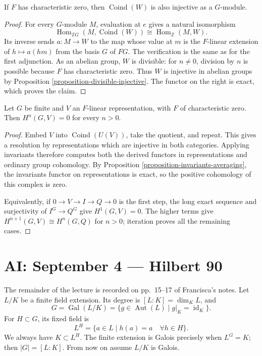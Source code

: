 \begin{proposition}
\label{proposition-coind-injective-4-sept}
If $F$ has characteristic zero, then
$\operatorname{Coind}(W)$ is also
injective as a $G$-module.
\end{proposition}

\begin{proof}
For every $G$-module $M$, evaluation at
$e$ gives a natural isomorphism
$$
\operatorname{Hom}_{\mathbb{Z}G}
(M,\operatorname{Coind}(W))
\cong\operatorname{Hom}_{\mathbb{Z}}(M,W).
$$
Its inverse sends $a:M\to W$ to the map
whose value at $m$ is the $F$-linear
extension of $h\mapsto a(hm)$ from the
basis $G$ of $FG$. The verification is
the same as for the first adjunction.
As an abelian group, $W$ is divisible:
for $n\ne0$, division by $n$ is possible
because $F$ has characteristic zero.
Thus $W$ is injective in abelian groups
by Proposition
\ref{proposition-divisible-injective}.
The functor on the right is exact,
which proves the claim.
\end{proof}

\begin{theorem}
\label{theorem-group-vanishing-4-sept}
Let $G$ be finite and $V$ an $F$-linear
representation, with $F$ of characteristic
zero. Then $H^n(G,V)=0$ for every $n>0$.
\end{theorem}

\begin{proof}
Embed $V$ into $\operatorname{Coind}(U(V))$,
take the quotient, and repeat. This gives
a resolution by representations which are
injective in both categories. Applying
invariants therefore computes both the
derived functors in representations and
ordinary group cohomology.
By Proposition
\ref{proposition-invariants-averaging},
the invariants functor on representations
is exact, so the positive cohomology
of this complex is zero.

Equivalently, if $0\to V\to I\to Q\to0$
is the first step, the long exact sequence
and surjectivity of $I^G\to Q^G$ give
$H^1(G,V)=0$. The higher terms give
$H^{n+1}(G,V)\cong H^n(G,Q)$ for $n>0$;
iteration proves all the remaining cases.
\end{proof}

\section{AI: September 4 --- Hilbert 90}
\label{section-hilberts-theorem-90-4-sept}

\noindent
The remainder of the lecture is recorded
on pp.~15--17 of Francisca's notes.
Let $L/K$ be a finite field extension.
Its degree is $[L:K]=\dim_K L$, and
$$
G=\operatorname{Gal}(L/K)
=\{g\in\operatorname{Aut}(L)\mid
g|_K=\operatorname{id}_K\}.
$$
For $H\subset G$, its fixed field is
$$
L^H=\{a\in L\mid h(a)=a
\quad\forall h\in H\}.
$$
We always have $K\subset L^H$.
The finite extension is Galois precisely
when $L^G=K$; then $|G|=[L:K]$.
From now on assume $L/K$ is Galois.

